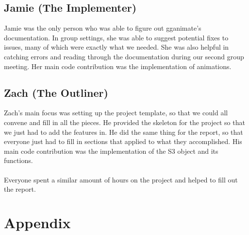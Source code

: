 \documentclass{article}
\begin{document}
\subsection{Jamie (The Implementer)}
Jamie was the only person who was able to figure out gganimate's documentation. In group settings, she was able to suggest potential fixes to issues, many of which were exactly what we needed. She was also helpful in catching errors and reading through the documentation during our second group meeting. Her main code contribution was the implementation of animations.
\subsection{Zach (The Outliner)}
Zach's main focus was setting up the project template, so that we could all convene and fill in all the pieces. He provided the skeleton for the project so that we just had to add the features in. He did the same thing for the report, so that everyone just had to fill in sections that applied to what they accomplished. His main code contribution was the implementation of the S3 object and its functions.\\\\
Everyone spent a similar amount of hours on the project and helped to fill out the report.

\section{Appendix}
\end{document}
